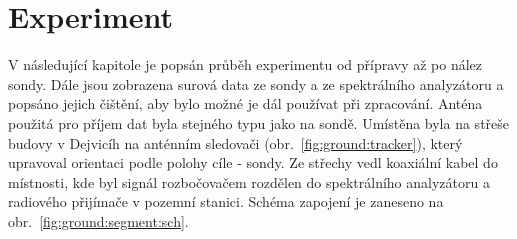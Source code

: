 \documentclass[twoside]{ctuthesis}
\theoremstyle{plain}
\theoremstyle{definition}
\theoremstyle{note}
\begin{document}
	

	

\chapter{Experiment}
\label{chap:expoeriment}
	V následující kapitole je popsán průběh experimentu od přípravy až po nález sondy. Dále jsou zobrazena surová data ze sondy a ze spektrálního analyzátoru a popsáno jejich čištění, aby bylo možné je dál používat při zpracování. Anténa použitá pro příjem dat byla stejného typu jako na sondě. Umístěna byla na střeše budovy v Dejvicíh na anténním sledovači (obr.~\ref{fig:ground:tracker}), který upravoval orientaci podle polohy cíle - sondy. Ze střechy vedl koaxiální kabel do místnosti, kde byl signál rozbočovačem rozdělen do spektrálního analyzátoru a radiového přijímače v pozemní stanici. Schéma zapojení je zaneseno na obr.~\ref{fig:ground:segment:sch}.
\end{document}
